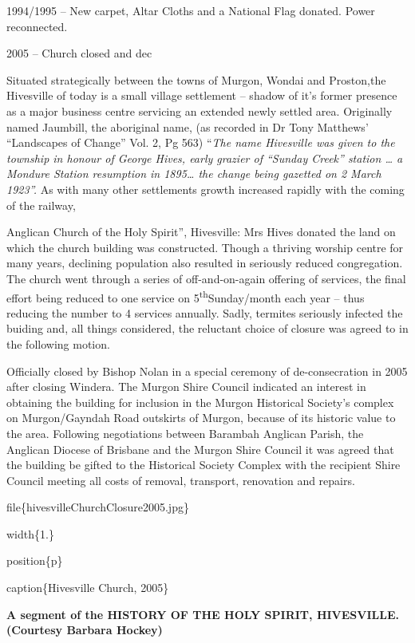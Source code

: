 1994/1995 -- New carpet, Altar Cloths and a National Flag donated. Power reconnected.

2005 -- Church closed and dec

Situated strategically between the towns of Murgon, Wondai and Proston,the Hivesville of today is a small village settlement -- shadow of it's former presence as a major business centre servicing an extended newly settled area. Originally named Jaumbill, the aboriginal name, (as recorded in Dr Tony Matthews' ``Landscapes of Change'' Vol. 2, Pg 563) ``\emph{The name Hivesville was given to the township in honour of George Hives, early grazier of ``Sunday Creek'' station \ldots{} a Mondure Station resumption in 1895\ldots{} the change being gazetted on 2 March 1923''.} As with many other settlements growth increased rapidly with the coming of the railway,

Anglican Church of the Holy Spirit'', Hivesville: Mrs Hives donated the land on which the church building was constructed. Though a thriving worship centre for many years, declining population also resulted in seriously reduced congregation. The church went through a series of off-and-on-again offering of services, the final effort being reduced to one service on 5\textsuperscript{th}Sunday/month each year -- thus reducing the number to 4 services annually. Sadly, termites seriously infected the buiding and, all things considered, the reluctant choice of closure was agreed to in the following motion.

Officially closed by Bishop Nolan in a special ceremony of de-consecration in 2005 after closing Windera. The Murgon Shire Council indicated an interest in obtaining the building for inclusion in the Murgon Historical Society's complex on Murgon/Gayndah Road outskirts of Murgon, because of its historic value to the area. Following negotiations between Barambah Anglican Parish, the Anglican Diocese of Brisbane and the Murgon Shire Council it was agreed that the building be gifted to the Historical Society Complex with the recipient Shire Council meeting all costs of removal, transport, renovation and repairs.

file\{hivesvilleChurchClosure2005.jpg\}

width\{1.\}

position\{p\}

caption\{Hivesville Church, 2005\}

\textbf{A segment of the HISTORY OF THE HOLY SPIRIT, HIVESVILLE. (Courtesy Barbara Hockey)}


